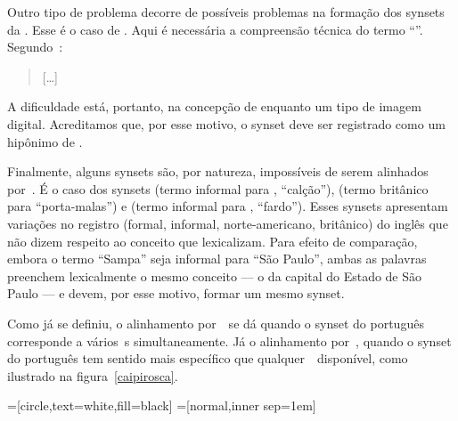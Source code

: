 Outro tipo de problema decorre de possíveis problemas na formação dos synsets
da \wnpr. Esse é o caso de . Aqui é
necessária a compreensão técnica do termo “”.
Segundo~\cite{wiki_bitmap}:

\begin{quote}
  [\ldots]~
\end{quote}

A dificuldade está, portanto, na concepção de \textit{} enquanto um
tipo de imagem digital. Acreditamos que, por esse motivo, o synset
 deve ser registrado como um hipônimo de
.

Finalmente, alguns synsets são, por natureza, impossíveis de serem alinhados
por~\eqsyn. É o caso dos synsets  (termo informal para
, “calção”),  (termo britânico para
“porta-malas”) e  (termo informal para
, “fardo”). Esses synsets apresentam variações no registro
(formal, informal, norte-americano, britânico) do inglês que não dizem respeito
ao conceito que lexicalizam. Para efeito de comparação, embora o termo “Sampa”
seja informal para “São Paulo”, ambas as palavras preenchem lexicalmente o
mesmo conceito --- o da capital do Estado de São Paulo --- e devem, por esse
motivo, formar um mesmo synset.

Como já se definiu, o alinhamento por~\eqnsyn\ se dá quando o synset do
português corresponde a vários~\ili s simultaneamente. Já o alinhamento
por~\eqhyper, quando o synset do português tem sentido mais específico que
qualquer~\ili\ disponível, como ilustrado na figura~\ref{caipirosca}.

	=[circle,text=white,fill=black]
	=[normal,inner sep=1em]

